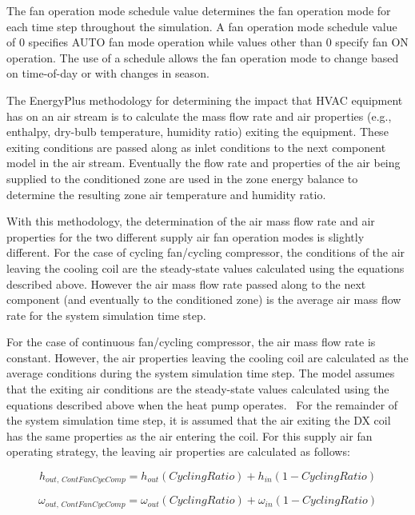 The fan operation mode schedule value determines the fan operation mode for each time step throughout the simulation. A fan operation mode schedule value of 0 specifies AUTO fan mode operation while values other than 0 specify fan ON operation. The use of a schedule allows the fan operation mode to change based on time-of-day or with changes in season.

The EnergyPlus methodology for determining the impact that HVAC equipment has on an air stream is to calculate the mass flow rate and air properties (e.g., enthalpy, dry-bulb temperature, humidity ratio) exiting the equipment. These exiting conditions are passed along as inlet conditions to the next component model in the air stream. Eventually the flow rate and properties of the air being supplied to the conditioned zone are used in the zone energy balance to determine the resulting zone air temperature and humidity ratio.

With this methodology, the determination of the air mass flow rate and air properties for the two different supply air fan operation modes is slightly different. For the case of cycling fan/cycling compressor, the conditions of the air leaving the cooling coil are the steady-state values calculated using the equations described above. However the air mass flow rate passed along to the next component (and eventually to the conditioned zone) is the average air mass flow rate for the system simulation time step.

For the case of continuous fan/cycling compressor, the air mass flow rate is constant. However, the air properties leaving the cooling coil are calculated as the average conditions during the system simulation time step. The model assumes that the exiting air conditions are the steady-state values calculated using the equations described above when the heat pump operates.~ For the remainder of the system simulation time step, it is assumed that the air exiting the DX coil has the same properties as the air entering the coil. For this supply air fan operating strategy, the leaving air properties are calculated as follows:

\begin{equation}
{h_{out,\,ContFanCycComp}} = {h_{out}}\left( {CyclingRatio} \right) + {h_{in}}\left( {1 - CyclingRatio} \right)
\end{equation}

\begin{equation}
{\omega_{out,\,ContFanCycComp}} = {\omega_{out}}\left( {CyclingRatio} \right) + {\omega_{in}}\left( {1 - CyclingRatio} \right)
\end{equation}

